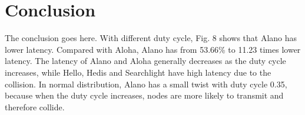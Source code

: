 \section{Conclusion}
\label{Conclusion}
The conclusion goes here.
With different duty cycle, Fig. 8 shows that Alano has lower latency. Compared with Aloha, Alano has from 53.66\% to 11.23 times lower latency. The latency of Alano and Aloha generally decreases as the duty cycle increases, while Hello, Hedis and Searchlight have high latency due to the collision. In normal distribution, Alano has a small twist with duty cycle 0.35, because when the duty cycle increases, nodes are more likely to transmit and therefore collide.